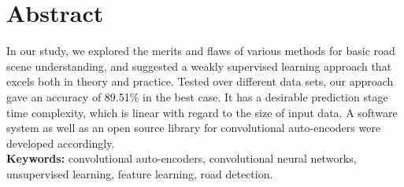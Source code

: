 
\chapter*{Abstract}
\label{cha:abstract}

In our study, we explored the merits and flaws of various methods for basic road scene understanding, and suggested a weakly supervised learning approach that excels both in theory and practice. Tested over different data sets, our approach gave an accuracy of 89.51\% in the best case. It has a desirable prediction stage time complexity, which is linear with regard to the size of input data. A software system as well as an open source library for convolutional auto-encoders were developed accordingly.
\\

\noindent\textbf{Keywords:} convolutional auto-encoders, convolutional neural networks, unsupervised learning, feature learning, road detection.

